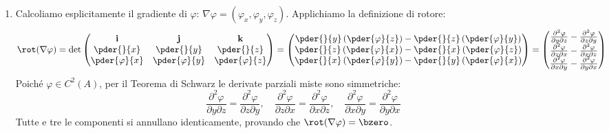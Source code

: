 \begin{dimostrazione}
\begin{enumerate}
    \item Calcoliamo esplicitamente il gradiente di $\varphi$: $\nabla \varphi = (\varphi_x, \varphi_y, \varphi_z)$.
    Applichiamo la definizione di rotore:
    \[
    \rot(\nabla \varphi) = \det \begin{pmatrix} \mathbf{i} & \mathbf{j} & \mathbf{k} \\ \pder{}{x} & \pder{}{y} & \pder{}{z} \\ \pder{\varphi}{x} & \pder{\varphi}{y} & \pder{\varphi}{z} \end{pmatrix} = \begin{pmatrix} \pder{}{y}\left(\pder{\varphi}{z}\right) - \pder{}{z}\left(\pder{\varphi}{y}\right) \\ \pder{}{z}\left(\pder{\varphi}{x}\right) - \pder{}{x}\left(\pder{\varphi}{z}\right) \\ \pder{}{x}\left(\pder{\varphi}{y}\right) - \pder{}{y}\left(\pder{\varphi}{x}\right) \end{pmatrix} = \begin{pmatrix} \frac{\partial^2 \varphi}{\partial y \partial z} - \frac{\partial^2 \varphi}{\partial z \partial y} \\ \frac{\partial^2 \varphi}{\partial z \partial x} - \frac{\partial^2 \varphi}{\partial x \partial z} \\ \frac{\partial^2 \varphi}{\partial x \partial y} - \frac{\partial^2 \varphi}{\partial y \partial x} \end{pmatrix}
    \]
    Poiché $\varphi \in C^2(A)$, per il Teorema di Schwarz le derivate parziali miste sono simmetriche:
    \[
    \frac{\partial^2 \varphi}{\partial y \partial z} = \frac{\partial^2 \varphi}{\partial z \partial y}, \quad \frac{\partial^2 \varphi}{\partial z \partial x} = \frac{\partial^2 \varphi}{\partial x \partial z}, \quad \frac{\partial^2 \varphi}{\partial x \partial y} = \frac{\partial^2 \varphi}{\partial y \partial x}
    \]
    Tutte e tre le componenti si annullano identicamente, provando che $\rot(\nabla \varphi) = \bzero$.


\end{enumerate}
\end{dimostrazione}
